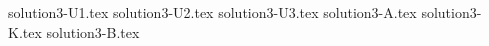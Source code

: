 \documentclass{article}
\begin{document}
{solution3-U1.tex}
{solution3-U2.tex}
{solution3-U3.tex}
{solution3-A.tex}
{solution3-K.tex}
{solution3-B.tex}
\end{document}
